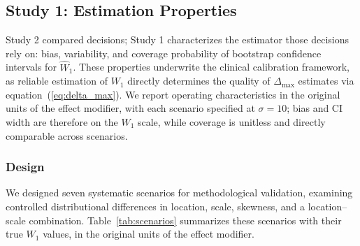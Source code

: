 \documentclass[AMA,Times1COL]{WileyNJDv5}
\begin{document}

\subsection{Study 1: Estimation Properties}\label{sec:study1}

Study 2 compared decisions; Study 1 characterizes the estimator those decisions rely on: bias, variability, and coverage probability of bootstrap confidence intervals for $\widehat{W}_1$. These properties underwrite the clinical calibration framework, as reliable estimation of $W_1$ directly determines the quality of $\Delta_{\max}$ estimates via equation~(\ref{eq:delta_max}). We report operating characteristics in the original units of the effect modifier, with each scenario specified at $\sigma = 10$; bias and CI width are therefore on the $W_1$ scale, while coverage is unitless and directly comparable across scenarios.

\subsubsection{Design}\label{sec:sim_design}

We designed seven systematic scenarios for methodological validation, examining controlled distributional differences in location, scale, skewness, and a location--scale combination. Table~\ref{tab:scenarios} summarizes these scenarios with their true $W_1$ values, in the original units of the effect modifier.
\end{document}
